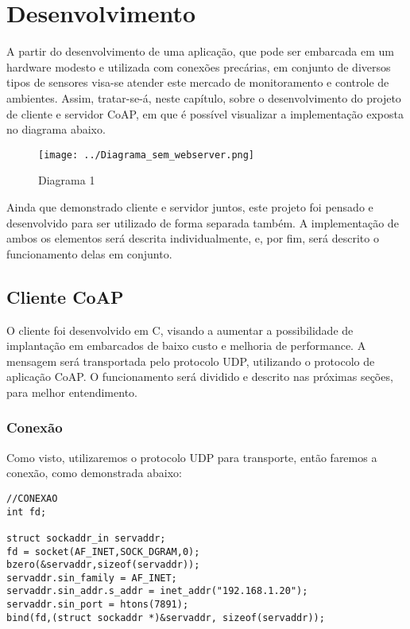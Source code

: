 \chapter{Desenvolvimento}

A partir do desenvolvimento de uma aplicação, que pode ser embarcada em um hardware modesto e utilizada com conexões precárias, em conjunto de diversos tipos de sensores visa-se atender este mercado de monitoramento e controle de ambientes. Assim, tratar-se-á, neste capítulo, sobre o desenvolvimento do projeto de cliente e servidor CoAP, em que é possível visualizar a implementação exposta no diagrama abaixo.

\begin{figure}[!htb]
	\centering
	\texttt{[image: ../Diagrama\_sem\_webserver.png]}
	\caption{Diagrama 1}
	\label{fig:Diagrama_lin_emb}
\end{figure}



Ainda que demonstrado cliente e servidor juntos, este projeto foi pensado e desenvolvido para ser utilizado de forma separada também. A implementação de ambos os elementos será descrita individualmente, e, por fim, será descrito o funcionamento delas em conjunto.

\section{Cliente CoAP}
O cliente foi desenvolvido em C, visando a aumentar a possibilidade de implantação em embarcados de baixo custo e melhoria de performance. A mensagem será transportada pelo protocolo UDP, utilizando o protocolo de aplicação CoAP. O funcionamento será dividido e descrito nas próximas seções, para melhor entendimento.


\subsection{Conexão}
Como visto, utilizaremos o protocolo UDP para transporte, então faremos a conexão, como demonstrada abaixo:

\begin{lstlisting}
//CONEXAO
int fd;

struct sockaddr_in servaddr;
fd = socket(AF_INET,SOCK_DGRAM,0);
bzero(&servaddr,sizeof(servaddr));
servaddr.sin_family = AF_INET;
servaddr.sin_addr.s_addr = inet_addr("192.168.1.20");
servaddr.sin_port = htons(7891);
bind(fd,(struct sockaddr *)&servaddr, sizeof(servaddr));
\end{lstlisting}

